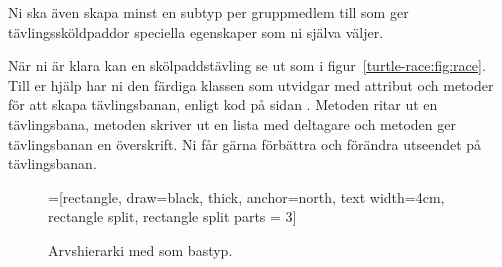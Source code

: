 \noindent Ni ska även skapa minst en subtyp per gruppmedlem till  som ger tävlingssköldpaddor speciella egenskaper som ni själva väljer.

När ni är klara kan en skölpaddstävling se ut som i figur~\ref{turtle-race:fig:race}.
Till er hjälp har ni den färdiga klassen  som utvidgar  med attribut och metoder för att skapa tävlingsbanan, enligt kod på sidan \pageref{turtle-race:RaceWindow}. Metoden  ritar ut en tävlingsbana, metoden  skriver ut en lista med deltagare och metoden  ger tävlingsbanan en överskrift. Ni får gärna förbättra och förändra utseendet på tävlingsbanan.

\begin{figure}
\begin{center}
\newcommand{\TextBox}[1]{\raisebox{0pt}[1em][0.5em]{#1}}
=[rectangle, draw=black,  thick, anchor=north, text width=4cm, rectangle split, rectangle split parts = 3]
\end{center}
\caption{Arvshierarki med  som bastyp.}
\label{turtle-race:fig:uml-diagram1}
\end{figure}



